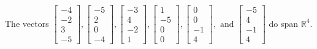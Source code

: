\begin{exercise}
\begin{exerciseStatement}
  \end{exerciseStatement}
  \begin{exerciseAnswer}
   The vectors \(\left[\begin{array}{r}
-4 \\
-2 \\
3 \\
-5
\end{array}\right] , \left[\begin{array}{r}
-5 \\
2 \\
0 \\
-4
\end{array}\right] , \left[\begin{array}{r}
-3 \\
4 \\
-2 \\
1
\end{array}\right] , \left[\begin{array}{r}
1 \\
-5 \\
0 \\
0
\end{array}\right] , \left[\begin{array}{r}
0 \\
0 \\
-1 \\
4
\end{array}\right] , \text{ and } \left[\begin{array}{r}
-5 \\
4 \\
-1 \\
4
\end{array}\right]\) 
  	 do  
	span \(\mathbb{R}^4\).
  


  \end{exerciseAnswer}
\end{exercise}